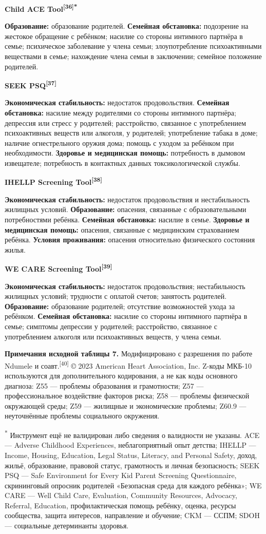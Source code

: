 \documentclass[11pt,a4paper]{article}
\newcommand{\src}[1]{\textsuperscript{[#1]}}
\newcommand{\heading}[1]{\par\medskip\textbf{#1}\par}
\begin{document}
\heading{Child ACE Tool\src{36}\textsuperscript{*}}
\textbf{Образование:} образование родителей. \textbf{Семейная обстановка:} подозрение на жестокое обращение с ребёнком; насилие со стороны интимного партнёра в семье; психическое заболевание у члена семьи; злоупотребление психоактивными веществами в семье; нахождение члена семьи в заключении; семейное положение родителей.

\heading{SEEK PSQ\src{37}}
\textbf{Экономическая стабильность:} недостаток продовольствия. \textbf{Семейная обстановка:} насилие между родителями со стороны интимного партнёра; депрессия или стресс у родителей; расстройство, связанное с употреблением психоактивных веществ или алкоголя, у родителей; употребление табака в доме; наличие огнестрельного оружия дома; помощь с уходом за ребёнком при необходимости. \textbf{Здоровье и медицинская помощь:} потребность в дымовом извещателе; потребность в контактных данных токсикологической службы.

\heading{IHELLP Screening Tool\src{38}}
\textbf{Экономическая стабильность:} недостаток продовольствия и нестабильность жилищных условий. \textbf{Образование:} опасения, связанные с образовательными потребностями ребёнка. \textbf{Семейная обстановка:} насилие в семье. \textbf{Здоровье и медицинская помощь:} опасения, связанные с медицинским страхованием ребёнка. \textbf{Условия проживания:} опасения относительно физического состояния жилья.

\heading{WE CARE Screening Tool\src{39}}
\textbf{Экономическая стабильность:} недостаток продовольствия; нестабильность жилищных условий; трудности с оплатой счетов; занятость родителей. \textbf{Образование:} образование родителей; отсутствие возможностей ухода за ребёнком. \textbf{Семейная обстановка:} насилие со стороны интимного партнёра в семье; симптомы депрессии у родителей; расстройство, связанное с употреблением алкоголя или психоактивных веществ, у члена семьи.

\textbf{Примечания исходной таблицы 7.} Модифицировано с разрешения по работе Ndumele и соавт.\src{40} © 2023 American Heart Association, Inc. Z-коды МКБ-10 используются для дополнительного кодирования, а не как коды основного диагноза: Z55 --- проблемы образования и грамотности; Z57 --- профессиональное воздействие факторов риска; Z58 --- проблемы физической окружающей среды; Z59 --- жилищные и экономические проблемы; Z60.9 --- неуточнённые проблемы социального окружения.

\textsuperscript{*} Инструмент ещё не валидирован либо сведения о валидности не указаны. ACE --- Adverse Childhood Experiences, неблагоприятный опыт детства; IHELLP --- Income, Housing, Education, Legal Status, Literacy, and Personal Safety, доход, жильё, образование, правовой статус, грамотность и личная безопасность; SEEK PSQ --- Safe Environment for Every Kid Parent Screening Questionnaire, скрининговый опросник родителей «Безопасная среда для каждого ребёнка»; WE CARE --- Well Child Care, Evaluation, Community Resources, Advocacy, Referral, Education, профилактическая помощь ребёнку, оценка, ресурсы сообщества, защита интересов, направление и обучение; CKM --- ССПМ; SDOH --- социальные детерминанты здоровья.
\end{document}
